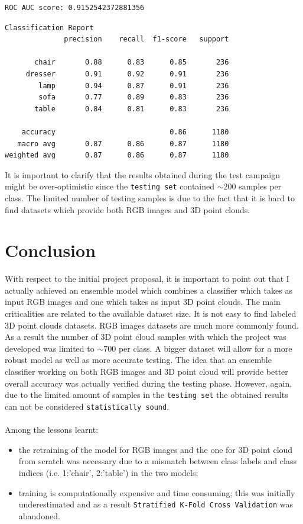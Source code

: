 \documentclass[11pt,a4paper]{article}
\begin{document}
\begin{lstlisting}[language=bash,frame=single]
ROC AUC score: 0.9152542372881356
\end{lstlisting}
\begin{lstlisting}[language=bash,frame=single]
Classification Report
              precision    recall  f1-score   support

       chair       0.88      0.83      0.85       236
     dresser       0.91      0.92      0.91       236
        lamp       0.94      0.87      0.91       236
        sofa       0.77      0.89      0.83       236
       table       0.84      0.81      0.83       236

    accuracy                           0.86      1180
   macro avg       0.87      0.86      0.87      1180
weighted avg       0.87      0.86      0.87      1180
\end{lstlisting}
It is important to clarify that the results obtained during the test campaign might be over-optimistic since the \texttt{testing set} contained $\sim 200$ samples per class. The limited number of testing samples is due to the fact that it is hard to find datasets which provide both RGB images and 3D point clouds.

\newpage
\section{Conclusion}
With respect to the initial project proposal, it is important to point out that I actually achieved an ensemble model which combines a classifier which takes as input RGB images and one which takes as input 3D point clouds. The main criticalities are related to the available dataset size. It is not easy to find labeled 3D point clouds datasets. RGB images datasets are much more commonly found. As a result the number of 3D point cloud samples with which the project was developed was limited to $\sim 700$ per class. A bigger dataset will allow for a more robust model as well as more accurate testing. The idea that an ensemble classifier working on both RGB images and 3D point cloud will provide better overall accuracy was actually verified during the testing phase. However, again, due to the limited amount of samples in the \texttt{testing set} the obtained results can not be considered \texttt{statistically sound}.\\
\\
Among the lessons learnt:
\begin{itemize}
    \item the retraining of the model for RGB images and the one for 3D point cloud from scratch was necessary due to a mismatch between class labels and class indices (i.e. 1:'chair', 2:'table') in the two models;
    \item training is computationally expensive and time consuming; this was initially underestimated and as a result \texttt{Stratified K-Fold Cross Validation} was abandoned.
\end{itemize}

\newpage
\nocite{kerasiopointnet}
\nocite{towardsdatasciencepointnet}
\nocite{mediumcomkfoldcrossvalidation}
\printbibliography
\end{document}
